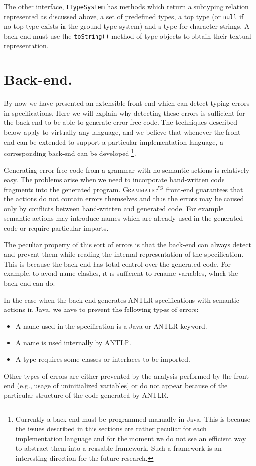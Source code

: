 \documentclass{informat} %
\newcommand{\tool}[1]{\textsc{#1}}
\newcommand{\ATF}{\textsc{Grammatic}$^{PG}$}
\begin{document}
{The other interface, \texttt{ITypeSystem} has methods which return a subtyping relation represented as discussed above, a set of predefined types, a top type (or \texttt{null} if no top type exists in the ground type system) and a type for character strings. A back-end must use the \texttt{toString()} method of type objects to obtain their textual representation.

\section{Back-end.}\label{Backend}

By now we have presented an extensible front-end which can detect typing errors in specifications. Here we will explain why detecting these errors is sufficient for the back-end to be able to generate error-free code. The techniques described below apply to virtually any language, and we believe that whenever the front-end can be extended to support a particular implementation language, a corresponding back-end can be developed \footnote{Currently a back-end must be programmed manually in Java. This is because the issues described in this sections are rather peculiar for each implementation language and for the moment we do not see an efficient way to abstract them into a reusable framework. Such a framework is an interesting direction for the future research.}.

Generating error-free code from a grammar with no semantic actions is relatively easy. The problems arise when we need to incorporate hand-written code fragments into the generated program. \ATF{} front-end guarantees that the actions do not contain errors themselves and thus the errors may be caused only by conflicts between hand-written and generated code. For example, semantic actions may introduce names which are already used in the generated code or require particular imports. 

The peculiar property of this sort of errors is that the back-end can always detect and prevent them while reading the internal representation of the specification. This is because the back-end has total control over the generated code. For example, to avoid name clashes, it is sufficient to rename variables, which the back-end can do.

In the case when the back-end generates \tool{ANTLR} specifications with semantic actions in Java, we have to prevent the following types of errors:
\begin{itemize}
	\item A name used in the specification is a Java or ANTLR keyword.
	\item A name is used internally by ANTLR.
	\item A type requires some classes or interfaces to be imported.
\end{itemize}
Other types of errors are either prevented by the analysis performed by the front-end (e.g., usage of uninitialized variables) or do not appear because of the particular structure of the code generated by \tool{ANTLR}.

}
\end{document}
